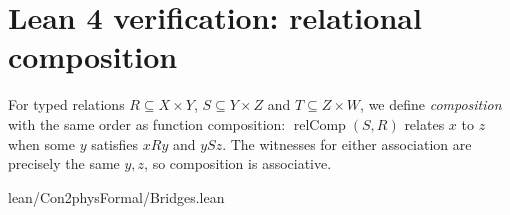 \section{Lean 4 verification: relational composition}
\label{sec:lean-bridge-04}
For typed relations $R\subseteq X\times Y$, $S\subseteq Y\times Z$
and $T\subseteq Z\times W$, we define \emph{composition} with the
same order as function composition: $\operatorname{relComp}(S,R)$
relates $x$ to $z$ when some $y$ satisfies $xRy$ and $ySz$.
The witnesses for either association are precisely the same $y,z$,
so composition is associative.


{lean/Con2physFormal/Bridges.lean}
